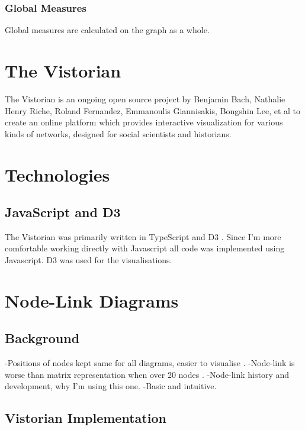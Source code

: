 \subsubsection{Global Measures}
Global measures are calculated on the graph as a whole.


\section{The Vistorian}
The Vistorian \cite{bach:hal-01205822} is an ongoing open source project by Benjamin Bach, Nathalie Henry Riche, Roland Fernandez, Emmanoulis Giannisakis, Bongshin Lee, et al to create an online platform which provides interactive visualization for various kinds of networks, designed for social scientists and historians. 

\section{Technologies}
\subsection{JavaScript and D3}
\label{sec:sec24}
The Vistorian was primarily written in TypeScript and D3 \cite{d3site}. Since I'm more comfortable working directly with Javascript all code was implemented using Javascript. D3 was used for the visualisations.

\section{Node-Link Diagrams}
\subsection{Background}
-Positions of nodes kept same for all diagrams, easier to visualise \cite{tsotaivg}.\newline
-Node-link is worse than matrix representation when over 20 nodes \cite{acotrogunlambr}.\newline
-Node-link history and development, why I'm using this one.\newline
-Basic and intuitive.\newline

\subsection{Vistorian Implementation}

